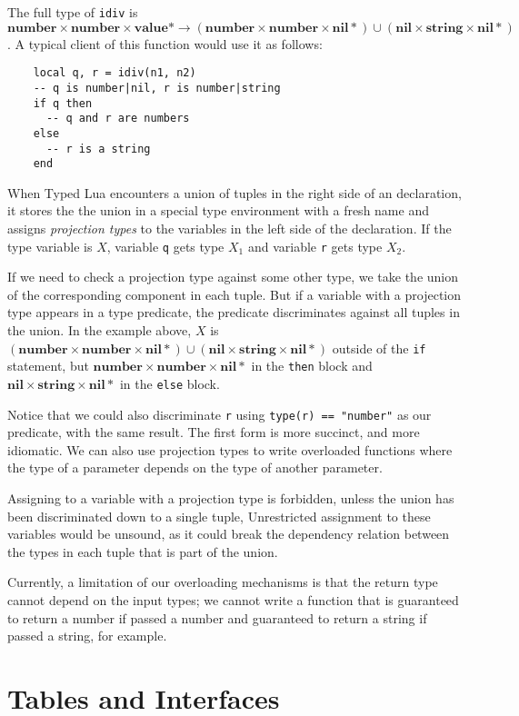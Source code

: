 \documentclass[preprint]{sig-alternate}
\newcommand{\Top}{\mathbf{value}}
\newcommand{\Nil}{\mathbf{nil}}
\newcommand{\Number}{\mathbf{number}}
\newcommand{\String}{\mathbf{string}}
\begin{document}
The full type of {\tt idiv} is $\Number \times \Number \times
\Top * \rightarrow (\Number \times \Number \times \Nil *) \cup
(\Nil \times \String \times \Nil *)$. A typical client of this
function would use it as follows:

\begin{verbatim}
    local q, r = idiv(n1, n2)
    -- q is number|nil, r is number|string
    if q then
      -- q and r are numbers
    else
      -- r is a string
    end
\end{verbatim}

When Typed Lua encounters a union of tuples in the right side
of an declaration, it stores the the union in a special type
environment with a fresh name and assigns {\em projection types} 
to the variables in the left side of the declaration. If the type
variable is $X$, variable {\tt q} gets type $X_1$ and variable
{\tt r} gets type $X_2$.

If we need to check a projection type
against some other type, we take the union of the corresponding
component in each tuple. But if a variable with a projection
type appears in a type predicate, the predicate discriminates
against all tuples in the union. In the example above,
$X$ is $(\Number \times \Number \times \Nil *) \cup
(\Nil \times \String \times \Nil *)$ outside of the {\tt if}
statement, but $\Number \times \Number \times \Nil *$ in the
{\tt then} block and $\Nil \times \String \times \Nil *$ in
the {\tt else} block.

Notice that we could also discriminate {\tt r} using
{\tt type(r) == "number"} as our predicate, with the same
result. The first form is more succinct, and more idiomatic.
We can also use projection types to write overloaded functions
where the type of a parameter depends on the type of another
parameter.

Assigning to a variable with a projection type is forbidden,
unless the union has been discriminated down to a single tuple,
Unrestricted assignment to these variables would be unsound,
as it could break the dependency relation between the types
in each tuple that is part of the union.

Currently, a limitation of our overloading mechanisms is that
the return type cannot depend on the input types; we cannot
write a function that is guaranteed to return a number if
passed a number and guaranteed to return a string if passed
a string, for example.

\section{Tables and Interfaces}
\label{sec:tables}
\end{document}
